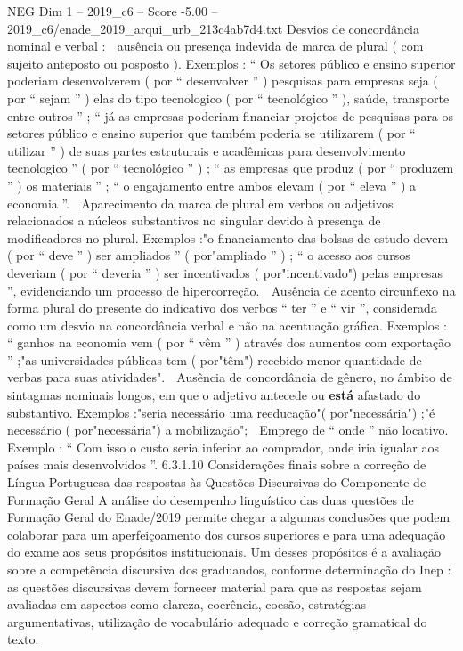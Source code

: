 \begin{textsample}{NEG Dim 1 – 2019\_c6 – Score -5.00 – 2019\_c6/enade\_2019\_arqui\_urb\_213c4ab7d4.txt}
Desvios de concordância nominal e verbal :  ausência ou presença indevida de marca de plural ( com sujeito anteposto ou posposto ).
Exemplos : “ Os setores público e ensino superior poderiam desenvolverem ( por “ desenvolver ” ) pesquisas para empresas seja ( por “ sejam ” ) elas do tipo tecnologico ( por “ tecnológico ” ), saúde, transporte entre outros ” ; “ já as empresas poderiam financiar projetos de pesquisas para os setores público e ensino superior que também poderia se utilizarem ( por “ utilizar ” ) de suas partes estruturais e acadêmicas para desenvolvimento tecnologico ” ( por “ tecnológico ” ) ; “ as empresas que produz ( por “ produzem ” ) os materiais ” ; “ o engajamento entre ambos elevam ( por “ eleva ” ) a economia ”.  Aparecimento da marca de plural em verbos ou adjetivos relacionados a núcleos substantivos no singular devido à presença de modificadores no plural.
Exemplos :"o financiamento das bolsas de estudo devem ( por “ deve ” ) ser ampliados ” ( por"ampliado ” ) ; “ o acesso aos cursos deveriam ( por “ deveria ” ) ser incentivados ( por"incentivado") pelas empresas ”, evidenciando um processo de hipercorreção.  Ausência de acento circunflexo na forma plural do presente do indicativo dos verbos “ ter ” e “ vir ”, considerada como um desvio na concordância verbal e não na acentuação gráfica.
Exemplos : “ ganhos na economia vem ( por “ vêm ” ) através dos aumentos com exportação ” ;"as universidades públicas tem ( por"têm") recebido menor quantidade de verbas para suas atividades".  Ausência de concordância de gênero, no âmbito de sintagmas nominais longos, em que o adjetivo antecede ou \textbf{está} afastado do substantivo.
Exemplos :"seria necessário uma reeducação"( por"necessária") ;"é necessário ( por"necessária") a mobilização";  Emprego de “ onde ” não locativo.
Exemplo : “ Com isso o custo seria inferior ao comprador, onde iria igualar aos países mais desenvolvidos ”. 6.3.1.10 Considerações finais sobre a correção de Língua Portuguesa das respostas às Questões Discursivas do Componente de Formação Geral A análise do desempenho linguístico das duas questões de Formação Geral do Enade/2019 permite chegar a algumas conclusões que podem colaborar para um aperfeiçoamento dos cursos superiores e para uma adequação do exame aos seus propósitos institucionais.
Um desses propósitos é a avaliação sobre a competência discursiva dos graduandos, conforme determinação do Inep : as questões discursivas devem fornecer material para que as respostas sejam avaliadas em aspectos como clareza, coerência, coesão, estratégias argumentativas, utilização de vocabulário adequado e correção gramatical do texto.

\end{textsample}
